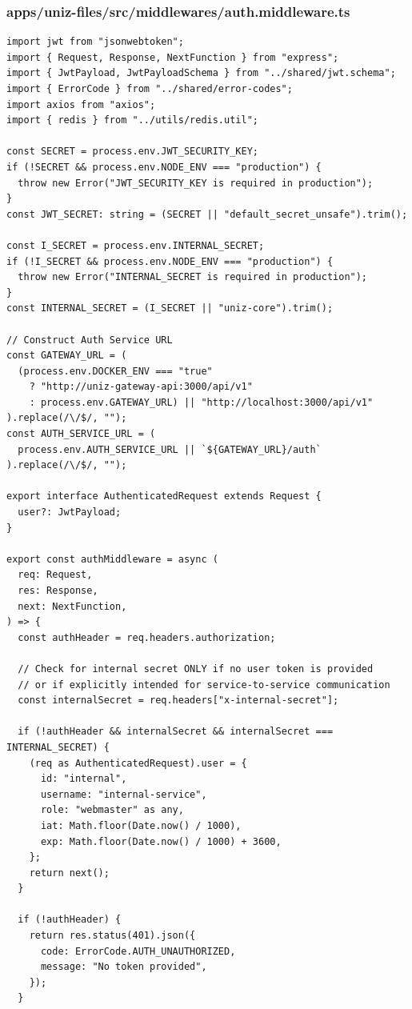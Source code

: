 \documentclass[11pt,a4paper,oneside]{article}
\begin{document}
\subsubsection*{apps/uniz-files/src/middlewares/auth.middleware.ts}
\begin{lstlisting}
import jwt from "jsonwebtoken";
import { Request, Response, NextFunction } from "express";
import { JwtPayload, JwtPayloadSchema } from "../shared/jwt.schema";
import { ErrorCode } from "../shared/error-codes";
import axios from "axios";
import { redis } from "../utils/redis.util";

const SECRET = process.env.JWT_SECURITY_KEY;
if (!SECRET && process.env.NODE_ENV === "production") {
  throw new Error("JWT_SECURITY_KEY is required in production");
}
const JWT_SECRET: string = (SECRET || "default_secret_unsafe").trim();

const I_SECRET = process.env.INTERNAL_SECRET;
if (!I_SECRET && process.env.NODE_ENV === "production") {
  throw new Error("INTERNAL_SECRET is required in production");
}
const INTERNAL_SECRET = (I_SECRET || "uniz-core").trim();

// Construct Auth Service URL
const GATEWAY_URL = (
  (process.env.DOCKER_ENV === "true"
    ? "http://uniz-gateway-api:3000/api/v1"
    : process.env.GATEWAY_URL) || "http://localhost:3000/api/v1"
).replace(/\/$/, "");
const AUTH_SERVICE_URL = (
  process.env.AUTH_SERVICE_URL || `${GATEWAY_URL}/auth`
).replace(/\/$/, "");

export interface AuthenticatedRequest extends Request {
  user?: JwtPayload;
}

export const authMiddleware = async (
  req: Request,
  res: Response,
  next: NextFunction,
) => {
  const authHeader = req.headers.authorization;

  // Check for internal secret ONLY if no user token is provided
  // or if explicitly intended for service-to-service communication
  const internalSecret = req.headers["x-internal-secret"];

  if (!authHeader && internalSecret && internalSecret === INTERNAL_SECRET) {
    (req as AuthenticatedRequest).user = {
      id: "internal",
      username: "internal-service",
      role: "webmaster" as any,
      iat: Math.floor(Date.now() / 1000),
      exp: Math.floor(Date.now() / 1000) + 3600,
    };
    return next();
  }

  if (!authHeader) {
    return res.status(401).json({
      code: ErrorCode.AUTH_UNAUTHORIZED,
      message: "No token provided",
    });
  }


\end{lstlisting}
\end{document}
